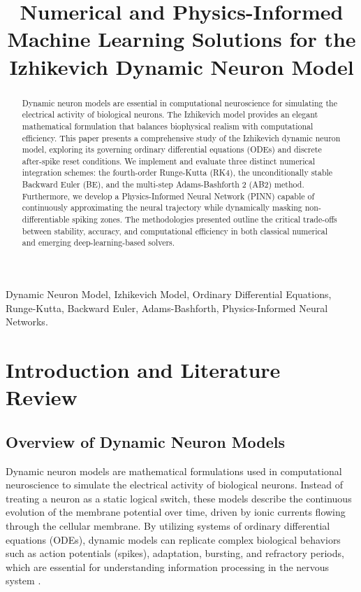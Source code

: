 \documentclass[conference]{IEEEtran}
\begin{document}
\title{Numerical and Physics-Informed Machine Learning Solutions for the Izhikevich Dynamic Neuron Model}

\author{
}

\maketitle

\begin{abstract}
Dynamic neuron models are essential in computational neuroscience for simulating the electrical activity of biological neurons. The Izhikevich model provides an elegant mathematical formulation that balances biophysical realism with computational efficiency. This paper presents a comprehensive study of the Izhikevich dynamic neuron model, exploring its governing ordinary differential equations (ODEs) and discrete after-spike reset conditions. We implement and evaluate three distinct numerical integration schemes: the fourth-order Runge-Kutta (RK4), the unconditionally stable Backward Euler (BE), and the multi-step Adams-Bashforth 2 (AB2) method. Furthermore, we develop a Physics-Informed Neural Network (PINN) capable of continuously approximating the neural trajectory while dynamically masking non-differentiable spiking zones. The methodologies presented outline the critical trade-offs between stability, accuracy, and computational efficiency in both classical numerical and emerging deep-learning-based solvers.
\end{abstract}

\begin{IEEEkeywords}
Dynamic Neuron Model, Izhikevich Model, Ordinary Differential Equations, Runge-Kutta, Backward Euler, Adams-Bashforth, Physics-Informed Neural Networks.
\end{IEEEkeywords}

\section{Introduction and Literature Review}

\subsection{Overview of Dynamic Neuron Models}
Dynamic neuron models are mathematical formulations used in computational neuroscience to simulate the electrical activity of biological neurons. Instead of treating a neuron as a static logical switch, these models describe the continuous evolution of the membrane potential over time, driven by ionic currents flowing through the cellular membrane. By utilizing systems of ordinary differential equations (ODEs), dynamic models can replicate complex biological behaviors such as action potentials (spikes), adaptation, bursting, and refractory periods, which are essential for understanding information processing in the nervous system \cite{schiesser}.
\end{document}
